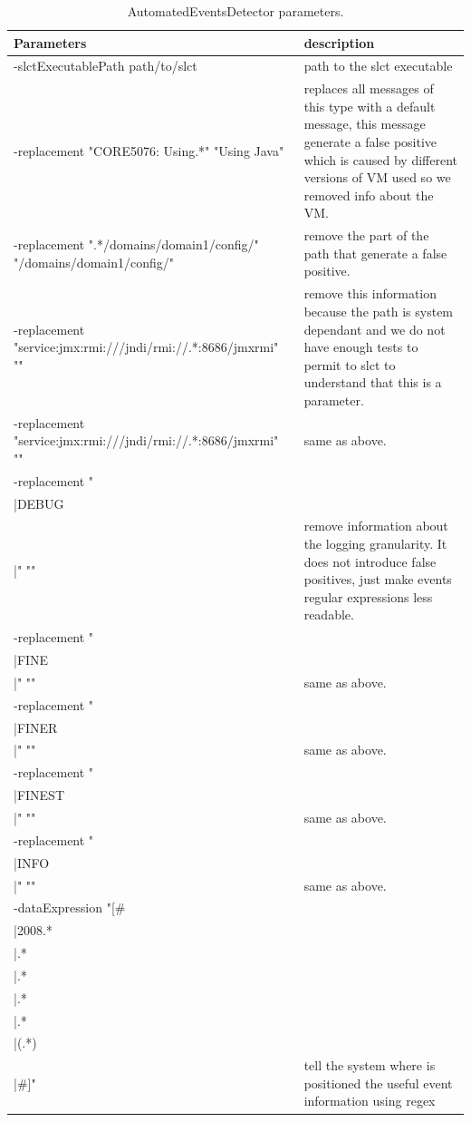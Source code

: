 \begin{longtable}{|p{6cm}|p{4cm}|}
\caption{AutomatedEventsDetector parameters.}\label{etdc}\\
\hline
Parameters&description\\
\hline
-slctExecutablePath path/to/slct&path to the slct executable\\
 \hline
 -replacement "CORE5076: Using.*" "Using Java"&replaces all messages
 of this type with a default message, this message generate a false
 positive which is caused by different versions of VM used so we
 removed info about the VM.\\
 \hline
 -replacement ".*/domains/domain1/config/"
 "/domains/domain1/config/"&remove the part of the path that generate
 a false positive.\\
 \hline
 -replacement "service:jmx:rmi:///jndi/rmi://.*:8686/jmxrmi"
""&remove
 this information because the path is system dependant and we do not
 have enough tests to permit to slct to understand that this is a
 parameter.\\
\hline
-replacement "service:jmx:rmi:///jndi/rmi://.*:8686/jmxrmi" ""&same
 as above.\\
\hline
-replacement "\\|DEBUG\\|" ""&remove information about the logging
granularity. It does not introduce false positives, just make events
regular expressions less readable.\\
\hline
-replacement "\\|FINE\\|" ""&same as above.\\
\hline
-replacement "\\|FINER\\|" ""&same as above.\\
\hline
-replacement "\\|FINEST\\|" ""&same as above.\\
\hline
-replacement "\\|INFO\\|" ""&same as above.\\
\hline
-dataExpression
"[\#\\|2008.*\\|.*\\|.*\\|.*\\|.*\\|(.*)\\|\#]"&tell the
system where is positioned the useful event information using regex

\end{longtable}

